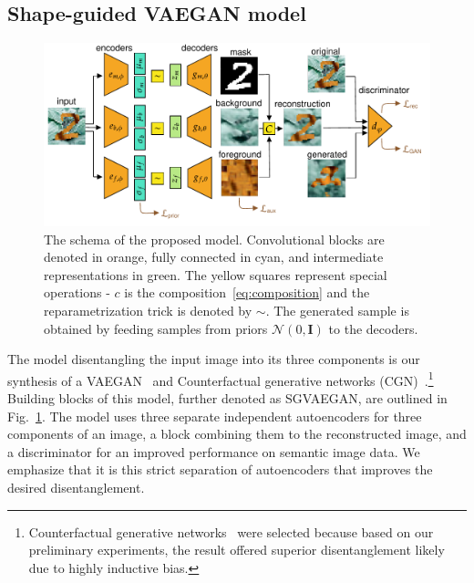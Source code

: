\subsection{Shape-guided VAEGAN model} \label{sec:sgvaegan}
 \begin{figure}[ht]
    \centering
       \includegraphics[width=\textwidth]{data/chapter_sgvaegan/fig2_sgvaegan_losses.pdf}
    \caption{The schema of the proposed model. Convolutional blocks are denoted in orange, fully connected in cyan, and intermediate representations in green. The yellow squares represent special operations - $c$ is the composition~\eqref{eq:composition} and the reparametrization trick is denoted by $\sim$. The generated sample is obtained by feeding samples from priors $\mathcal{N}(0,\mathbf{I})$ to the decoders.}
    \label{fig:sgvaegan_schema}
\end{figure}

The model disentangling the input image into its three components is our synthesis of a VAEGAN~\cite{larsen2016autoencoding} and Counterfactual generative networks (CGN)~\cite{sauer2021counterfactual}.\footnote{Counterfactual generative networks~\cite{sauer2021counterfactual} were selected because based on our preliminary experiments, the result offered superior disentanglement likely due to highly inductive bias.} Building blocks of this model, further denoted as SGVAEGAN, are outlined in Fig.~\ref{fig:sgvaegan_schema}. The model uses three separate independent autoencoders for three components of an image, a block combining them to the reconstructed image, and a discriminator for an improved performance on semantic image data. We emphasize that it is this strict separation of autoencoders that improves the desired disentanglement.

